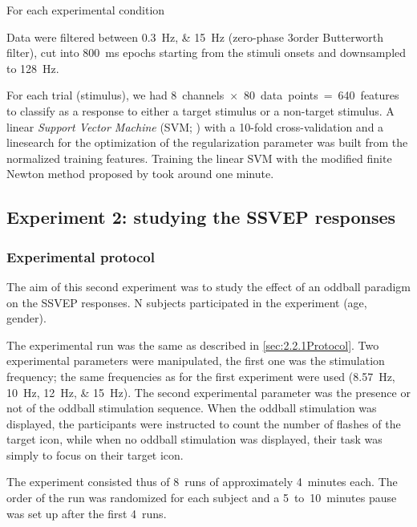 \documentclass[10pt]{article}
\begin{document}
        For each experimental condition
        
        
        Data were filtered between \SIlist[list-units = single]{0.3;15}{\Hz} (zero-phase 3\rd order Butterworth filter), cut into \SI{800}{\ms} epochs starting from the stimuli onsets and downsampled to \SI{128}{\Hz}.

        For each trial (stimulus), we had 8~channels~$\times$~80~data~points~=~640~features to classify as a response to either a target stimulus or a non-target stimulus.
        A linear \emph{Support Vector Machine} (SVM; \cite{Cristianini2000,Suykens2002}) with a 10-fold cross-validation and a linesearch for the optimization of the regularization parameter was built from the normalized training features.
        Training the linear SVM with the modified finite Newton method proposed by \textcite{Keerthi2006} took around one minute.




    \subsection{Experiment 2: studying the \acs{SSVEP} responses}
    \label{sec:2.3SSVEP}

        \subsubsection{Experimental protocol}
        \label{sec:2.3.1Protocol}

        The aim of this second experiment was to study the effect of an oddball paradigm on the \ac{SSVEP} responses.
        N subjects participated in the experiment (age, gender).

        The experimental run was the same as described in \autoref{sec:2.2.1Protocol}.
        Two experimental parameters were manipulated, the first one was the stimulation frequency; the same frequencies as for the first experiment were used (\SIlist[list-units = single]{8.57;10;12;15}{\Hz}).
        The second experimental parameter was the presence or not of the oddball stimulation sequence.
        When the oddball stimulation was displayed, the participants were instructed to count the number of flashes of the target icon, while when no oddball stimulation was displayed, their task was simply to focus on their target icon.

        The experiment consisted thus of 8~runs of approximately 4~minutes each.
        The order of the run was randomized for each subject and a 5~to~10~minutes pause was set up after the first 4~runs.
\end{document}
